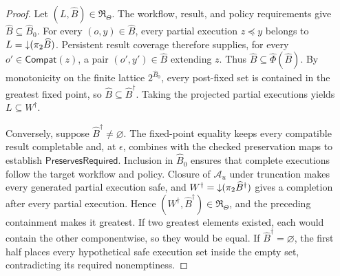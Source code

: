 \begin{proof}
Let \((L,\widehat B)\in\mathfrak R_\Theta\).
The workflow, result, and policy requirements give \(\widehat B\subseteq\widehat B_0\).
For every \((o,y)\in\widehat B\), every partial execution \(z\preceq y\) belongs to \(L=\mathord{\downarrow}(\pi_2\widehat B)\).
Persistent result coverage therefore supplies, for every \(o'\in\mathsf{Compat}(z)\), a pair \((o',y')\in\widehat B\) extending \(z\).
Thus \(\widehat B\subseteq\widehat\Phi(\widehat B)\).
By monotonicity on the finite lattice \(2^{\widehat B_0}\), every post-fixed set is contained in the greatest fixed point, so \(\widehat B\subseteq\widehat B^\dagger\).
Taking the projected partial executions yields \(L\subseteq W^\dagger\).

Conversely, suppose \(\widehat B^\dagger\ne\varnothing\).
The fixed-point equality keeps every compatible result completable and, at \(\epsilon\), combines with the checked preservation maps to establish \(\mathsf{PreservesRequired}\).
Inclusion in \(\widehat B_0\) ensures that complete executions follow the target workflow and policy.
Closure of \(\mathcal A_u\) under truncation makes every generated partial execution safe, and \(W^\dagger=\mathord{\downarrow}(\pi_2\widehat B^\dagger)\) gives a completion after every partial execution.
Hence \((W^\dagger,\widehat B^\dagger)\in\mathfrak R_\Theta\), and the preceding containment makes it greatest.
If two greatest elements existed, each would contain the other componentwise, so they would be equal.
If \(\widehat B^\dagger=\varnothing\), the first half places every hypothetical safe execution set inside the empty set, contradicting its required nonemptiness.
\end{proof}

